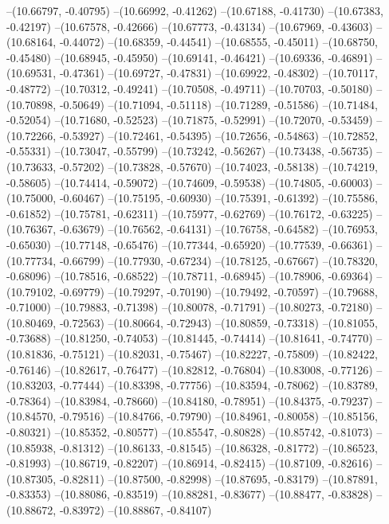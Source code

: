 --(10.66797, -0.40795)
--(10.66992, -0.41262)
--(10.67188, -0.41730)
--(10.67383, -0.42197)
--(10.67578, -0.42666)
--(10.67773, -0.43134)
--(10.67969, -0.43603)
--(10.68164, -0.44072)
--(10.68359, -0.44541)
--(10.68555, -0.45011)
--(10.68750, -0.45480)
--(10.68945, -0.45950)
--(10.69141, -0.46421)
--(10.69336, -0.46891)
--(10.69531, -0.47361)
--(10.69727, -0.47831)
--(10.69922, -0.48302)
--(10.70117, -0.48772)
--(10.70312, -0.49241)
--(10.70508, -0.49711)
--(10.70703, -0.50180)
--(10.70898, -0.50649)
--(10.71094, -0.51118)
--(10.71289, -0.51586)
--(10.71484, -0.52054)
--(10.71680, -0.52523)
--(10.71875, -0.52991)
--(10.72070, -0.53459)
--(10.72266, -0.53927)
--(10.72461, -0.54395)
--(10.72656, -0.54863)
--(10.72852, -0.55331)
--(10.73047, -0.55799)
--(10.73242, -0.56267)
--(10.73438, -0.56735)
--(10.73633, -0.57202)
--(10.73828, -0.57670)
--(10.74023, -0.58138)
--(10.74219, -0.58605)
--(10.74414, -0.59072)
--(10.74609, -0.59538)
--(10.74805, -0.60003)
--(10.75000, -0.60467)
--(10.75195, -0.60930)
--(10.75391, -0.61392)
--(10.75586, -0.61852)
--(10.75781, -0.62311)
--(10.75977, -0.62769)
--(10.76172, -0.63225)
--(10.76367, -0.63679)
--(10.76562, -0.64131)
--(10.76758, -0.64582)
--(10.76953, -0.65030)
--(10.77148, -0.65476)
--(10.77344, -0.65920)
--(10.77539, -0.66361)
--(10.77734, -0.66799)
--(10.77930, -0.67234)
--(10.78125, -0.67667)
--(10.78320, -0.68096)
--(10.78516, -0.68522)
--(10.78711, -0.68945)
--(10.78906, -0.69364)
--(10.79102, -0.69779)
--(10.79297, -0.70190)
--(10.79492, -0.70597)
--(10.79688, -0.71000)
--(10.79883, -0.71398)
--(10.80078, -0.71791)
--(10.80273, -0.72180)
--(10.80469, -0.72563)
--(10.80664, -0.72943)
--(10.80859, -0.73318)
--(10.81055, -0.73688)
--(10.81250, -0.74053)
--(10.81445, -0.74414)
--(10.81641, -0.74770)
--(10.81836, -0.75121)
--(10.82031, -0.75467)
--(10.82227, -0.75809)
--(10.82422, -0.76146)
--(10.82617, -0.76477)
--(10.82812, -0.76804)
--(10.83008, -0.77126)
--(10.83203, -0.77444)
--(10.83398, -0.77756)
--(10.83594, -0.78062)
--(10.83789, -0.78364)
--(10.83984, -0.78660)
--(10.84180, -0.78951)
--(10.84375, -0.79237)
--(10.84570, -0.79516)
--(10.84766, -0.79790)
--(10.84961, -0.80058)
--(10.85156, -0.80321)
--(10.85352, -0.80577)
--(10.85547, -0.80828)
--(10.85742, -0.81073)
--(10.85938, -0.81312)
--(10.86133, -0.81545)
--(10.86328, -0.81772)
--(10.86523, -0.81993)
--(10.86719, -0.82207)
--(10.86914, -0.82415)
--(10.87109, -0.82616)
--(10.87305, -0.82811)
--(10.87500, -0.82998)
--(10.87695, -0.83179)
--(10.87891, -0.83353)
--(10.88086, -0.83519)
--(10.88281, -0.83677)
--(10.88477, -0.83828)
--(10.88672, -0.83972)
--(10.88867, -0.84107)
